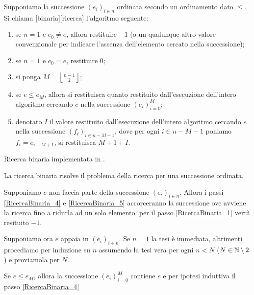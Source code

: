 \begin{Definition}
  Supponiamo la successione $(e_i)_{i \in n}$ ordinata secondo un ordinamento
dato $\leq$. Si chiama [binaria][ricerca] l'algoritmo
seguente:
  \begin{enumerate}
    \item\label{RicercaBinaria_1} se $n = 1$ e $e_0 \neq e$, allora restituire
      $-1$ (o un qualunque altro valore convenzionale per indicare l'assenza
      dell'elemento cercato nella successione);
    \item\label{RicercaBinaria_2} se $n = 1$ e $e_0 = e$, restituire $0$;
    \item\label{RicercaBinaria_3} si ponga
      $M = \left \lfloor \frac{n - 1}{2} \right \rfloor$;
    \item\label{RicercaBinaria_4} se $e \leq e_M$, allora si restituisca quanto
      restituito dall'esecuzione dell'intero algoritmo cercando $e$ nella
      successione $(e_i)_{i = 0}^M$;
    \item\label{RicercaBinaria_5} denotato $I$ il valore
      restituito dall'esecuzione dell'intero algoritmo cercando $e$ nella
      successione
      $(f_i)_{i \in n - M - 1}$,
      dove per ogni $i \in n - M - 1$ poniamo
      $f_i = e_{i + M + 1}$,
      si restituisca $M + 1 + I$.
  \end{enumerate}
\end{Definition}
\begin{listing}
	\caption{Ricerca binaria implementata in .}
\end{listing}
\begin{Theorem}
  La ricerca binaria risolve il problema della ricerca per una successione
  ordinata.
\end{Theorem}
\Proof Supponiamo $e$ non faccia parte della successione $(e_i)_{i \in n}$.
Allora i passi \ref{RicercaBinaria_4} e \ref{RicercaBinaria_5} accorceranno
la successione ove avviene la ricerca fino a ridurla ad un solo elemento:
per il passo \ref{RicercaBinaria_1} verr\`a resituito $-1$.
\par Supponiamo ora $e$ appaia in $(e_i)_{i \in n}$.
Se $n = 1$ la tesi \`e immediata, altrimenti procediamo
per induzione su $n$ assumendo la tesi vera per ogni $n < N$
($N \in \mathbb{N} \setminus 2$) e proviamola per $N$.
\par Se $e \leq e_M$, allora la successione
$(e_i)_{i = 0}^M$
contiene $e$ e per ipotesi induttiva il passo \ref{RicercaBinaria_4}

